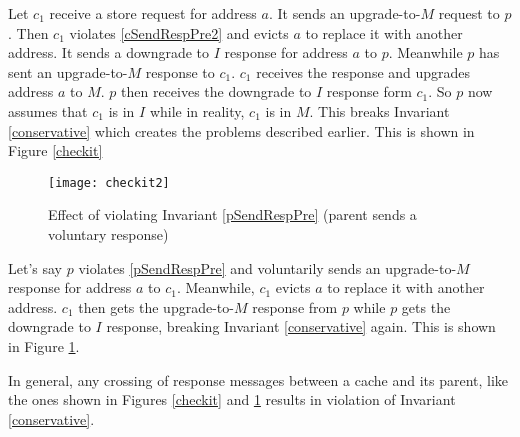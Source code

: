 Let $c_1$ receive a store request for address $a$. It sends an upgrade-to-$M$
request to $p$. Then $c_1$ violates \ref{cSendRespPre2} and evicts $a$ to
replace it with another address. It sends a downgrade to $I$ response for
address $a$ to $p$.  Meanwhile $p$ has sent an upgrade-to-$M$ response to
$c_1$. $c_1$ receives the response and upgrades address $a$ to $M$. $p$ then
receives the downgrade to $I$ response form $c_1$. So $p$ now assumes that
$c_1$ is in $I$ while in reality, $c_1$ is in $M$. This breaks Invariant
\ref{conservative} which creates the problems described earlier. This is shown
in Figure \ref{checkit}

\begin{figure}
\centering
\texttt{[image: checkit2]}
\caption{Effect of violating Invariant \ref{pSendRespPre} (parent sends a voluntary response)}
\label{checkit2}
\end{figure}

Let's say $p$ violates \ref{pSendRespPre} and voluntarily sends an
upgrade-to-$M$ response for address $a$ to $c_1$.  Meanwhile, $c_1$ evicts $a$
to replace it with another address. $c_1$ then gets the upgrade-to-$M$ response
from $p$ while $p$ gets the downgrade to $I$ response, breaking Invariant
\ref{conservative} again. This is shown in Figure \ref{checkit2}.

In general, any crossing of response messages between a cache and its parent,
like the ones shown in Figures \ref{checkit} and \ref{checkit2} results in
violation of Invariant \ref{conservative}.
